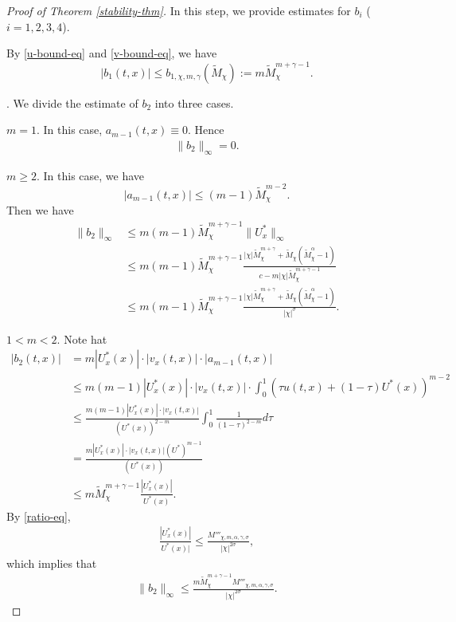 \documentclass[11pt]{article} %
\theoremstyle{remark}
\theoremstyle{remark}
\numberwithin{equation}{section}
\numberwithin{figure}{section}
\numberwithin{table}{section}
\begin{document}
\begin{proof}[Proof of Theorem \ref{stability-thm}]
\smallskip

 In this step, we provide estimates for $b_i$ ($i=1,2,3,4$). 

\smallskip


  By \eqref{u-bound-eq} and \eqref{v-bound-eq}, we have
\begin{equation}
\label{b-1-eq}
|b_1(t,x)|\le b_{1,\chi,m,\gamma}(\widetilde M_\chi):= m \widetilde M_\chi^{m+\gamma-1}.
\end{equation}

\smallskip

.  We divide  the estimate of $b_2$ into three cases.


\smallskip

  $m=1$. In this case,  $a_{m-1}(t,x)\equiv 0$. Hence
\begin{align}
\label{b-2-eq1}
\|b_2\|_\infty=0.
\end{align}

\smallskip

  $m\ge 2$. In this case,  we have 
$$
|a_{m-1}(t, x)|\le (m-1) \widetilde M_{\chi}^{m-2}.
$$
Then we have
\begin{align}
\label{b-2-eq2}
 \|b_2\|_\infty&\le m(m-1)\widetilde  M_{\chi}^{m+\gamma-1}\|U_x^*\|_\infty\nonumber\\
&\le m(m-1) \widetilde M_{\chi}^{m+\gamma-1} \frac{|\chi| \widetilde M_\chi^{m+\gamma} +\widetilde M_\chi(\widetilde M_\chi^\alpha -1)}{c- m |\chi| \widetilde M^{m+\gamma-1}_\chi } \nonumber\\
&\le m(m-1) \widetilde M_{\chi}^{m+\gamma-1} \frac{|\chi| \widetilde M_\chi^{m+\gamma} +\widetilde M_\chi(\widetilde M_\chi^\alpha -1)}{|\chi|^\sigma} .
\end{align}

\smallskip

 $1<m<2$. Note hat
\begin{align*}
|b_2(t,x)|&=m|U_x^*(x)|\cdot |v_x(t,x)|\cdot |a_{m-1}(t,x)|\\
&\le m(m-1)|U_x^*(x)| \cdot |v_x(t, x)|\cdot \int_0^1 (\tau u(t,x)+(1-\tau)U^*(x))^{m-2}\\
&\le \frac{m(m-1)|U_x^*(x)| \cdot |v_x(t,x)|}{(U^*(x))^{2-m}}\int_0^1 \frac{1}{(1-\tau)^{2-m}}d\tau\\
&=\frac{m|U_x^*(x)| \cdot |v_x(t,x)| (U^*)^{m-1}}{(U^*(x))}\\
&\le m \widetilde M_\chi ^{m +\gamma -1} \frac{|U_x^*(x)| }{U^*(x)}.
\end{align*}
By \eqref{ratio-eq},
\begin{align*}
\frac{|U^*_x(x)|}{U^*(x)|}\le \frac{M'''_{\chi, m, \alpha,\gamma,\sigma}}{|\chi|^{2\sigma}},
\end{align*}
which implies that
\begin{align}
\label{b-2-eq3}
\|b_2\|_\infty\le \frac{m \widetilde M_{\chi}^{m+\gamma-1} M'''_{\chi,m,\alpha,\gamma,\sigma}}{|\chi|^{2\sigma}}.
\end{align}



\end{proof}
\end{document}
